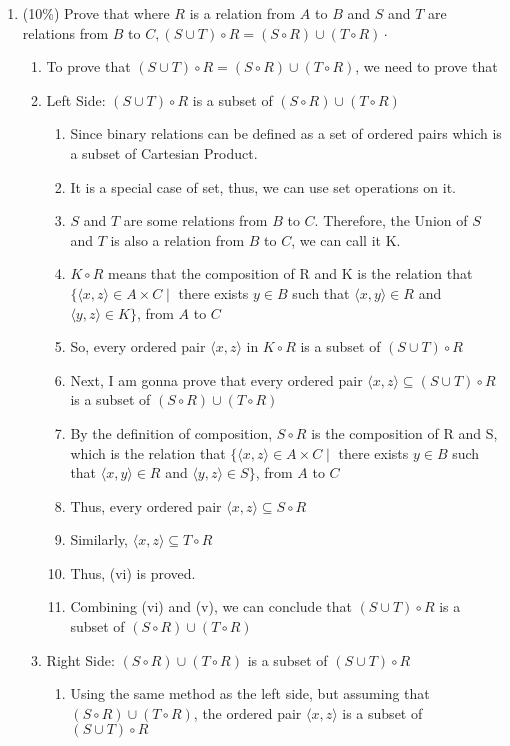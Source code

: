 \documentclass[10pt]{article}
\begin{document}
\begin{enumerate}
\begin{enumerate}
\begin{enumerate}
    \end{enumerate}
  \end{enumerate}
  \item (10\%) Prove that where $R$ is a relation from $A$ to $B$ and $S$ and $T$ are relations from $B$ to $C,(S \cup T) \circ R=(S \circ R) \cup(T \circ R) \cdot$
  \begin{enumerate}
    \item To prove that $(S \cup T) \circ R=(S \circ R) \cup(T \circ R)$, we need to prove that 
    \item Left Side: $(S \cup T) \circ R$ is a subset of $(S \circ R) \cup(T \circ R)$
      \begin{enumerate}
        \item Since binary relations can be defined as a set of ordered pairs which is a subset of Cartesian Product.
        \item It is a special case of set, thus, we can use set operations on it.
        \item $S$ and $T$ are some relations from $B$ to $C$. Therefore, the Union of $S$ and $T$ is also a relation from $B$ to $C$, we can call it K.
        \item $K \circ R $ means that the composition of R and K is the relation that $\{\langle x, z\rangle \in A \times C \mid$ there exists $y \in B$ such that $\langle x, y\rangle \in R$ and $\langle y, z\rangle \in K\}$, from $A$ to $C$
        \item So, every ordered pair $\langle x, z\rangle$ in $K \circ R$ is a subset of $(S \cup T) \circ R$
        \item Next, I am gonna prove that every ordered pair $\langle x, z\rangle \subseteq (S \cup T) \circ R$ is a subset of $(S \circ R) \cup(T \circ R)$
        \item By the definition of composition, $S \circ R$ is the composition of R and S, which is the relation that $\{\langle x, z\rangle \in A \times C \mid$ there exists $y \in B$ such that $\langle x, y\rangle \in R$ and $\langle y, z\rangle \in S\}$, from $A$ to $C$
        \item Thus, every ordered pair $\langle x, z\rangle \subseteq S \circ R$
        \item Similarly, $\langle x, z\rangle \subseteq T \circ R$
        \item Thus, (vi) is proved. 
        \item Combining (vi) and (v), we can conclude that $(S \cup T) \circ R$ is a subset of $(S \circ R) \cup(T \circ R)$
      \end{enumerate}
    \item Right Side: $(S \circ R) \cup(T \circ R)$ is a subset of $(S \cup T) \circ R$ 
    \begin{enumerate}
      \item Using the same method as the left side, but assuming that $(S \circ R) \cup(T \circ R)$, the ordered pair $\langle x, z\rangle$ is a subset of $(S \cup T) \circ R$
    \end{enumerate}
  \end{enumerate}
  

\end{enumerate}
\end{document}
